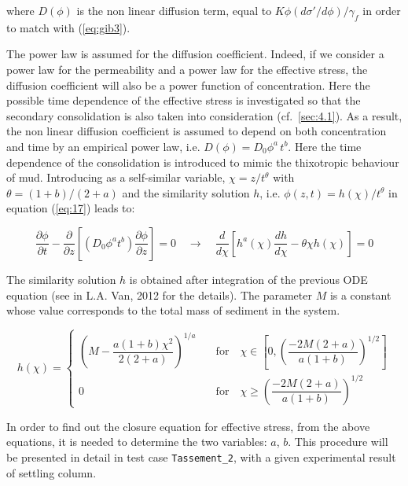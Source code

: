 where $D(\phi)$ is the non linear diffusion term, equal to $K\phi(d\sigma'/d\phi)/\gamma_f$ in order to match with (\ref{eq:gib3}).

The power law is assumed for the diffusion coefficient. Indeed, if we
consider a power law for the permeability and a power law for the effective
stress, the diffusion coefficient will also be a power function of
concentration. Here the possible time dependence of the effective stress is
investigated so that the secondary consolidation is also taken into
consideration (cf.~\ref{sec:4.1}). As a result, the non linear diffusion coefficient
is assumed to depend on both concentration and time by an empirical power
law, i.e. $D(\phi)=D_0\phi^a\,t^b$. Here the time dependence of
the consolidation is introduced to mimic the thixotropic behaviour of mud.
Introducing as a self-similar variable, $\chi=z/t^{\theta}$ with $\theta
=(1+b)/(2+a)$ and the similarity solution $h$, i.e. $\phi(z,t)=h(\chi)/t^{\theta}$ in equation (\ref{eq:17}) leads to:

\begin{equation*}
\dfrac{\partial \phi}{\partial t} -\dfrac{\partial}{\partial z} \left[
\left( D_0 \phi^a t^b\right) \dfrac{\partial \phi }{\partial z}\right] =0\quad\rightarrow\quad
\dfrac{d}{d\chi} \left[h^a(\chi)\dfrac{dh}{d\chi} - \theta\chi h(\chi)\right] = 0 
\end{equation*}

The similarity solution $h$ is obtained after integration of the previous
ODE equation (see in L.A. Van, 2012 for the details). The parameter $M$ is a
constant whose value corresponds to the total mass of sediment in the system.

\begin{equation*}
h(\chi)=\left\{ 
\begin{array}{ll}
\left( M-\dfrac{a(1+b)\chi^2}{2(2+a)}\right)^{1/a} & \quad \text{for}\quad
\chi \in \left[0,\left(\dfrac{-2M(2+a)}{a(1+b)}\right)^{1/2} \right] \\ 
0 & \quad \text{for}\quad \chi \geq \left(\dfrac{-2M(2+a)}{a(1+b)}\right)^{1/2}%
\end{array}
\right. 
\end{equation*}

In order to find out the closure equation for effective stress, from the
above equations, it is needed to determine the two variables: $a$, $b$. This
procedure will be presented in detail in test case \texttt{Tassement\_2}, with a
given experimental result of settling column.

